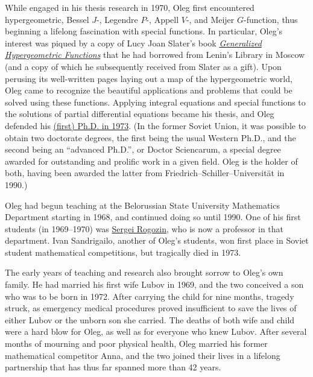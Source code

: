 While engaged in his thesis research in 1970, Oleg first encountered hypergeometric, Bessel $J$-, Legendre $P$-, Appell $V$-, and Meijer $G$-function, thus beginning a lifelong fascination with special functions. In particular, Oleg's interest was piqued by a copy of Lucy Joan Slater's book \href{http://www.amazon.co.uk/Generalized-Hypergeometric-Functions-Lucy-Slater/dp/052109061X}{\textit{Generalized Hypergeometric Functions}} that he had borrowed from Lenin's Library in Moscow (and a copy of which he subsequently received from Slater as a gift). Upon perusing its well-written pages laying out a map of the hypergeometric world, Oleg came to recognize the beautiful applications and problems that could be solved using these functions. Applying integral equations and special functions to the solutions of partial differential equations became his thesis, and Oleg defended his \href{http://www.genealogy.ams.org/id.php?id=63083}{(first) Ph.D. in 1973}. (In the former Soviet Union, it was possible to obtain two doctorate degrees, the first being the usual Western Ph.D., and the second being an ``advanced Ph.D.'', or Doctor Sciencarum, a special degree awarded for outstanding and prolific work in a given field. Oleg is the holder of both, having been awarded the latter from Friedrich--Schiller--Universit\"at in 1990.)



Oleg had begun teaching at the Belorussian State University Mathematics Department starting in 1968, and continued doing so until 1990. One of his first students (in 1969–1970) was \href{http://www.mathnet.ru/eng/person48302}{Sergei Rogozin}, who is now a professor in that department. Ivan Sandrigailo, another of Oleg's students, won first place in Soviet student mathematical competitions, but tragically died in 1973.



The early years of teaching and research also brought sorrow to Oleg's own family. He had married his first wife Lubov in 1969, and the two conceived a son who was to be born in 1972. After carrying the child for nine months, tragedy struck, as emergency medical procedures proved insufficient to save the lives of either Lubov or the unborn son she carried. The deaths of both wife and child were a hard blow for Oleg, as well as for everyone who knew Lubov. After several months of mourning and poor physical health, Oleg married his former mathematical competitor Anna, and the two joined their lives in a lifelong partnership that has thus far spanned more than 42 years.




